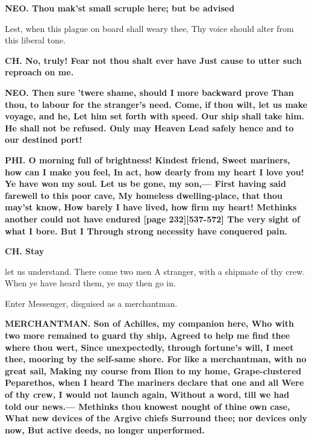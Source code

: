 \documentclass[11pt,letter]{book}
\begin{document}
\par \textbf{NEO. Thou mak’st small scruple here; but be advised}
\par   Lest, when this plague on board shall weary thee, Thy voice should alter from this liberal tone.

\par \textbf{CH. No, truly! Fear not thou shalt ever have Just cause to utter such reproach on me.}
\par 

\par \textbf{NEO. Then sure ’twere shame, should I more backward prove Than thou, to labour for the stranger’s need. Come, if thou wilt, let us make voyage, and he, Let him set forth with speed. Our ship shall take him. He shall not be refused. Only may Heaven Lead safely hence and to our destined port!}
\par 

\par \textbf{PHI. O morning full of brightness! Kindest friend, Sweet mariners, how can I make you feel, In act, how dearly from my heart I love you! Ye have won my soul. Let us be gone, my son,— First having said farewell to this poor cave, My homeless dwelling-place, that thou may’st know, How barely I have lived, how firm my heart! Methinks another could not have endured [page 232][537-572] The very sight of what I bore. But I Through strong necessity have conquered pain.}
\par 

\par \textbf{CH. Stay}
\par   let us understand. There come two men A stranger, with a shipmate of thy crew. When ye have heard them, ye may then go in.

\par  Enter Messenger, disguised as a merchantman.

\par \textbf{MERCHANTMAN. Son of Achilles, my companion here, Who with two more remained to guard thy ship, Agreed to help me find thee where thou wert, Since unexpectedly, through fortune’s will, I meet thee, mooring by the self-same shore. For like a merchantman, with no great sail, Making my course from Ilion to my home, Grape-clustered Peparethos, when I heard The mariners declare that one and all Were of thy crew, I would not launch again, Without a word, till we had told our news.— Methinks thou knowest nought of thine own case, What new devices of the Argive chiefs Surround thee; nor devices only now, But active deeds, no longer unperformed.}
\par 
\end{document}
